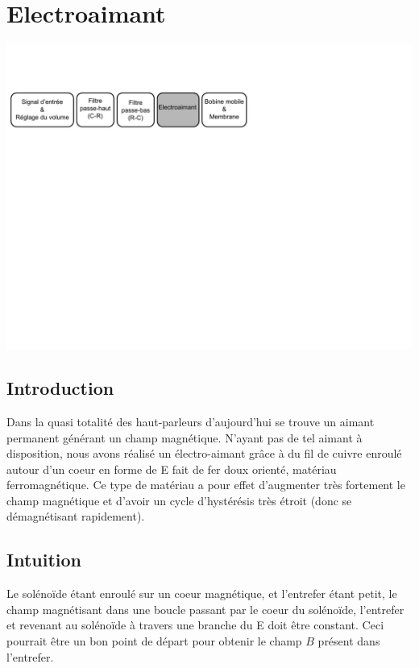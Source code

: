 \chapter{Electroaimant}
\label{electroaimant}
\begin{center}
\includegraphics[width=\textwidth]{img/Schemabloc3}
\end{center}

\section{Introduction}
Dans la quasi totalité des haut-parleurs d'aujourd'hui se trouve un aimant permanent générant un champ magnétique.
N'ayant pas de tel aimant à disposition, nous avons réalisé un électro-aimant grâce à du fil de cuivre enroulé autour 
d'un coeur en forme de E fait de fer doux orienté, matériau ferromagnétique. Ce type de matériau a pour effet d'augmenter très fortement le champ magnétique et d'avoir un cycle d'hystérésis très étroit (donc se démagnétisant rapidement).
\section{Intuition}
Le solénoïde étant enroulé sur un coeur magnétique, et l'entrefer étant petit, le champ magnétisant dans 
une boucle passant par le coeur du solénoïde, l'entrefer et revenant au solénoïde à travers une branche 
du E doit être constant. Ceci pourrait être un bon point de départ pour obtenir le champ $B$ présent dans l'entrefer.

